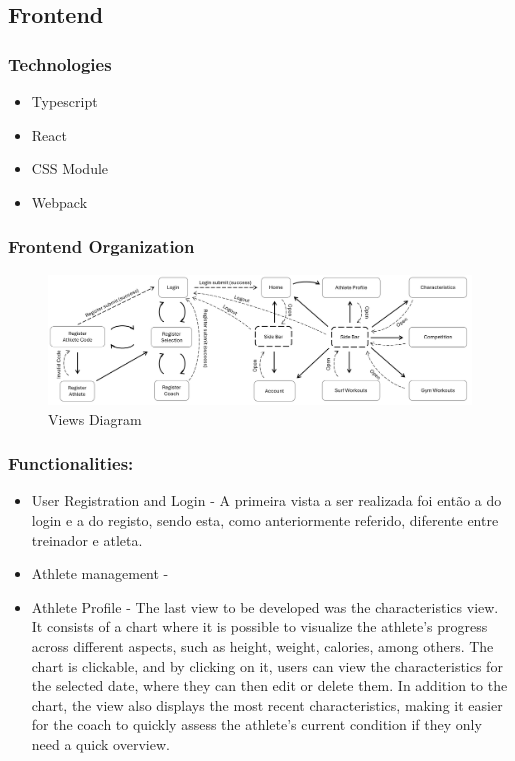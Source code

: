 \documentclass[a4paper,twoside,11pt]{article}
\begin{document}
\subsection{Frontend}

\subsubsection{Technologies}
\begin{itemize}
\item Typescript
\item React
\item CSS Module
\item Webpack
\end{itemize}

\subsubsection{Frontend Organization}

\begin{figure}[H]
\centering
\includegraphics[width=5in]{ViewsDiagram.png}
\caption{Views Diagram}
\end{figure}

\subsubsection{Functionalities:}
\begin{itemize}
\item User Registration and Login - 
A primeira vista a ser realizada foi então a do login e a do registo, sendo esta, como anteriormente referido, diferente entre treinador e atleta.

\item Athlete management - 

\item Athlete Profile - 
The last view to be developed was the characteristics view. It consists of a chart where it is possible to visualize the athlete’s progress across different aspects, such as height, weight, calories, among others. The chart is clickable, and by clicking on it, users can view the characteristics for the selected date, where they can then edit or delete them. In addition to the chart, the view also displays the most recent characteristics, making it easier for the coach to quickly assess the athlete's current condition if they only need a quick overview.
\end{itemize}
\end{document}
